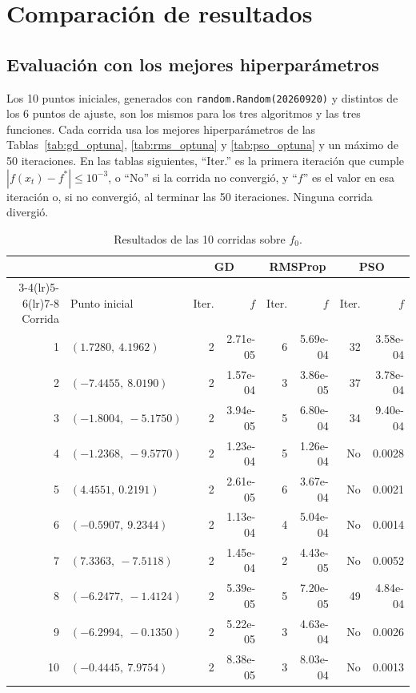 \section{Comparación de resultados}
\label{sec:comparacion}

\subsection{Evaluación con los mejores hiperparámetros}
\label{sec:evaluacion}

Los 10 puntos iniciales, generados con \texttt{random.Random(20260920)} y
distintos de los 6 puntos de ajuste, son los mismos para los tres
algoritmos y las tres funciones. Cada corrida usa los mejores
hiperparámetros de las Tablas~\ref{tab:gd_optuna}, \ref{tab:rms_optuna} y
\ref{tab:pso_optuna} y un máximo de 50 iteraciones. En las tablas
siguientes, ``Iter.'' es la primera iteración que cumple
$|f(x_t)-f^*|\leq10^{-3}$, o ``No'' si la corrida no convergió, y ``$f$''
es el valor en esa iteración o, si no convergió, al terminar las 50
iteraciones. Ninguna corrida divergió.

\begin{table}[H]
\centering
\small
\begin{tabular}{rlrrrrrr}
\toprule
 & & \multicolumn{2}{c}{GD} & \multicolumn{2}{c}{RMSProp} & \multicolumn{2}{c}{PSO} \\
\cmidrule(lr){3-4}\cmidrule(lr){5-6}\cmidrule(lr){7-8}
Corrida & Punto inicial & Iter. & $f$ & Iter. & $f$ & Iter. & $f$ \\
\midrule
1 & $(1.7280,\ 4.1962)$ & 2 & 2.71e-05 & 6 & 5.69e-04 & 32 & 3.58e-04 \\
2 & $(-7.4455,\ 8.0190)$ & 2 & 1.57e-04 & 3 & 3.86e-05 & 37 & 3.78e-04 \\
3 & $(-1.8004,\ -5.1750)$ & 2 & 3.94e-05 & 5 & 6.80e-04 & 34 & 9.40e-04 \\
4 & $(-1.2368,\ -9.5770)$ & 2 & 1.23e-04 & 5 & 1.26e-04 & No & 0.0028 \\
5 & $(4.4551,\ 0.2191)$ & 2 & 2.61e-05 & 6 & 3.67e-04 & No & 0.0021 \\
6 & $(-0.5907,\ 9.2344)$ & 2 & 1.13e-04 & 4 & 5.04e-04 & No & 0.0014 \\
7 & $(7.3363,\ -7.5118)$ & 2 & 1.45e-04 & 2 & 4.43e-05 & No & 0.0052 \\
8 & $(-6.2477,\ -1.4124)$ & 2 & 5.39e-05 & 5 & 7.20e-05 & 49 & 4.84e-04 \\
9 & $(-6.2994,\ -0.1350)$ & 2 & 5.22e-05 & 3 & 4.63e-04 & No & 0.0026 \\
10 & $(-0.4445,\ 7.9754)$ & 2 & 8.38e-05 & 3 & 8.03e-04 & No & 0.0013 \\
\bottomrule
\end{tabular}
\caption{Resultados de las 10 corridas sobre $f_0$.}
\label{tab:eval_f0}
\end{table}

